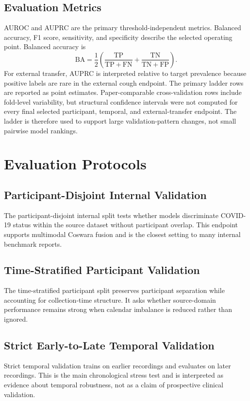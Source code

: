\documentclass[journal]{IEEEtran}
\begin{document}
\subsection{Evaluation Metrics}
AUROC and AUPRC are the primary threshold-independent metrics. Balanced accuracy, F1 score, sensitivity, and specificity describe the selected operating point. Balanced accuracy is
\begin{equation}
\mathrm{BA}=\frac{1}{2}\left(\frac{\mathrm{TP}}{\mathrm{TP}+\mathrm{FN}}+
\frac{\mathrm{TN}}{\mathrm{TN}+\mathrm{FP}}\right).
\end{equation}
For external transfer, AUPRC is interpreted relative to target prevalence because positive labels are rare in the external cough endpoint. The primary ladder rows are reported as point estimates. Paper-comparable cross-validation rows include fold-level variability, but structural confidence intervals were not computed for every final selected participant, temporal, and external-transfer endpoint. The ladder is therefore used to support large validation-pattern changes, not small pairwise model rankings.

\section{Evaluation Protocols}
\subsection{Participant-Disjoint Internal Validation}
The participant-disjoint internal split tests whether models discriminate COVID-19 status within the source dataset without participant overlap. This endpoint supports multimodal Coswara fusion and is the closest setting to many internal benchmark reports.

\subsection{Time-Stratified Participant Validation}
The time-stratified participant split preserves participant separation while accounting for collection-time structure. It asks whether source-domain performance remains strong when calendar imbalance is reduced rather than ignored.

\subsection{Strict Early-to-Late Temporal Validation}
Strict temporal validation trains on earlier recordings and evaluates on later recordings. This is the main chronological stress test and is interpreted as evidence about temporal robustness, not as a claim of prospective clinical validation.
\end{document}
